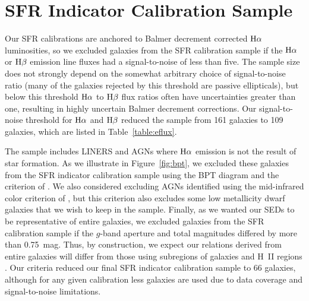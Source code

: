 \documentclass[preprint]{aastex61}
\begin{document}
%

\section{SFR Indicator Calibration Sample}
\label{sec:sample}

Our SFR calibrations are anchored to Balmer decrement corrected ${\rm H\alpha}$ luminosities, so we excluded galaxies from the SFR calibration sample if the ${\rm H\alpha}$ or ${\rm H \beta}$ emission line fluxes had a signal-to-noise of less than five. The sample size does not strongly depend on the somewhat arbitrary choice of signal-to-noise ratio (many of the galaxies rejected by this threshold are passive ellipticals), but below this threshold ${\rm H\alpha}$ to ${\rm H\beta}$ flux ratios  often have uncertainties greater than one, resulting in highly uncertain Balmer decrement corrections. Our signal-to-noise threshold for ${\rm H\alpha}$ and ${\rm H \beta}$ reduced the sample from 161 galaxies to 109 galaxies, which are listed in Table~\ref{table:eflux}.

The \citet{bro14} sample includes LINERS and AGNs where ${\rm H\alpha}$ emission is not the result of star formation. As we illustrate in Figure~\ref{fig:bpt}, we excluded these galaxies from the SFR indicator calibration sample using the BPT diagram \citep{bal81} and the criterion of \citet{kau03}. We also considered excluding AGNs identified using the mid-infrared color criterion of \citet{ste05}, but this criterion also excludes some low metallicity dwarf galaxies that we wish to keep in the sample. Finally, as we wanted our SEDs to be representative of entire galaxies, we excluded galaxies from the SFR calibration sample if the $g$-band aperture and total magnitudes differed by more than 0.75~mag. Thus, by construction, we expect our relations derived from entire galaxies will differ from those using subregions of galaxies and H~II regions \citep[e.g.,][]{cal07,rel07,ken09}. Our criteria reduced our final SFR indicator calibration sample to 66 galaxies, although for any given calibration less galaxies are used due to data coverage and signal-to-noise limitations.
\end{document}
